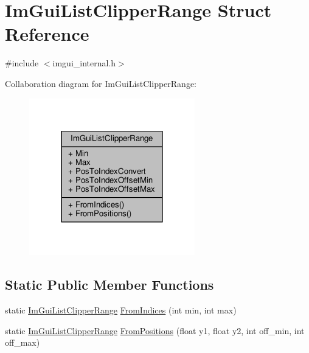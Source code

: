 \hypertarget{structImGuiListClipperRange}{}\section{Im\+Gui\+List\+Clipper\+Range Struct Reference}
\label{structImGuiListClipperRange}


{\ttfamily \#include $<$imgui\+\_\+internal.\+h$>$}



Collaboration diagram for Im\+Gui\+List\+Clipper\+Range\+:
\nopagebreak
\begin{figure}[H]
\begin{center}
\leavevmode
\includegraphics[width=204pt]{structImGuiListClipperRange__coll__graph}
\end{center}
\end{figure}
\subsection*{Static Public Member Functions}
\begin{DoxyCompactItemize}
\item 
static \hyperlink{structImGuiListClipperRange}{Im\+Gui\+List\+Clipper\+Range} \hyperlink{structImGuiListClipperRange_ae04d9b8993b4fafcbf416fbaeed316b1}{From\+Indices} (int min, int max)
\item 
static \hyperlink{structImGuiListClipperRange}{Im\+Gui\+List\+Clipper\+Range} \hyperlink{structImGuiListClipperRange_a3aa356015543dd8c9096e412390aacf0}{From\+Positions} (float y1, float y2, int off\+\_\+min, int off\+\_\+max)
\end{DoxyCompactItemize}
